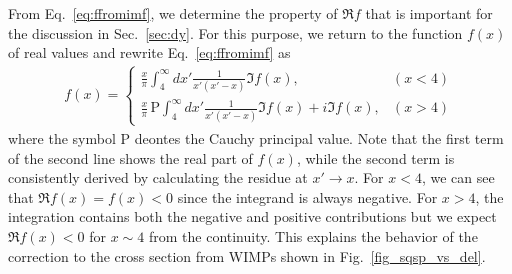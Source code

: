 \documentclass[12pt,twoside,book]{article}
\begin{document}
From Eq.~\eqref{eq:ffromimf}, we determine the property of $\Re f$ that is important for the discussion in Sec.~\ref{sec:dy}.
For this purpose, we return to the function $f(x)$ of real values and rewrite Eq.~\eqref{eq:ffromimf} as
\begin{align}
  f(x) = \begin{cases}
    \displaystyle{\frac{x}{\pi} \int_4^\infty dx' \frac{1}{x' (x'-x)} \Im f(x)}, & (x < 4)\\
    \displaystyle{\frac{x}{\pi}\, \mathrm{P} \int_4^\infty dx' \frac{1}{x' (x'-x)} \Im f(x) + i \Im f(x)}, & (x > 4)
  \end{cases}
\end{align}
where the symbol $\mathrm{P}$ deontes the Cauchy principal value.
Note that the first term of the second line shows the real part of $f(x)$, while the second term is consistently derived by calculating the residue at $x' \to x$.
For $x<4$, we can see that $\Re f(x) = f(x) < 0$ since the integrand is always negative.
For $x>4$, the integration contains both the negative and positive contributions but we expect $\Re f(x) < 0$ for $x \sim 4$ from the continuity.
This explains the behavior of the correction to the cross section from WIMPs shown in Fig.~\ref{fig_sqsp_vs_del}.
\end{document}
